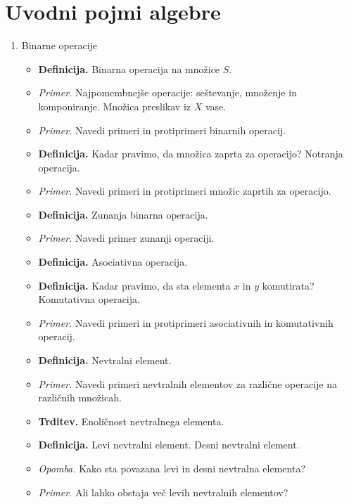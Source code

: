 \section{Uvodni pojmi algebre}

\begin{enumerate}
    \item Binarne operacije
    \begin{itemize}
        \item \colorbox{purple!30}{\textbf{Definicija.}} Binarna operacija na množice $S$.        
        \item \colorbox{yellow!30}{\emph{Primer.}} Najpomembnejše operacije: seštevanje, množenje in komponiranje. Množica preslikav iz $X$ vase.
        \item \colorbox{yellow!30}{\emph{Primer.}} Navedi primeri in protiprimeri binarnih operacij.
        \item \colorbox{purple!30}{\textbf{Definicija.}} Kadar pravimo, da množica zaprta za operacijo? Notranja operacija.
        \item \colorbox{yellow!30}{\emph{Primer.}} Navedi primeri in protiprimeri množic zaprtih za operacijo. 
        \item \colorbox{purple!30}{\textbf{Definicija.}} Zunanja binarna operacija. 
        \item \colorbox{yellow!30}{\emph{Primer.}} Navedi primer zunanji operaciji.
        \item \colorbox{purple!30}{\textbf{Definicija.}} Asociativna operacija. 
        \item \colorbox{purple!30}{\textbf{Definicija.}} Kadar pravimo, da sta elementa $x$ in $y$ komutirata? Komutativna operacija.
        \item \colorbox{yellow!30}{\emph{Primer.}} Navedi primeri in protiprimeri asociativnih in komutativnih operacij.
        \item \colorbox{purple!30}{\textbf{Definicija.}} Nevtralni element.
        \item \colorbox{yellow!30}{\emph{Primer.}} Navedi primeri nevtralnih elementov za različne operacije na različnih množicah.
        \item \colorbox{blue!30}{\textbf{Trditev.}} Enoličnost nevtralnega elementa.
        \item \colorbox{purple!30}{\textbf{Definicija.}} Levi nevtralni element. Desni nevtralni element.
        \item \colorbox{yellow!30}{\emph{Opomba.}} Kako sta povazana levi in desni nevtralna elementa?
        \item \colorbox{yellow!30}{\emph{Primer.}} Ali lahko obstaja več levih nevtralnih elementov?
    \end{itemize}


\end{enumerate}

